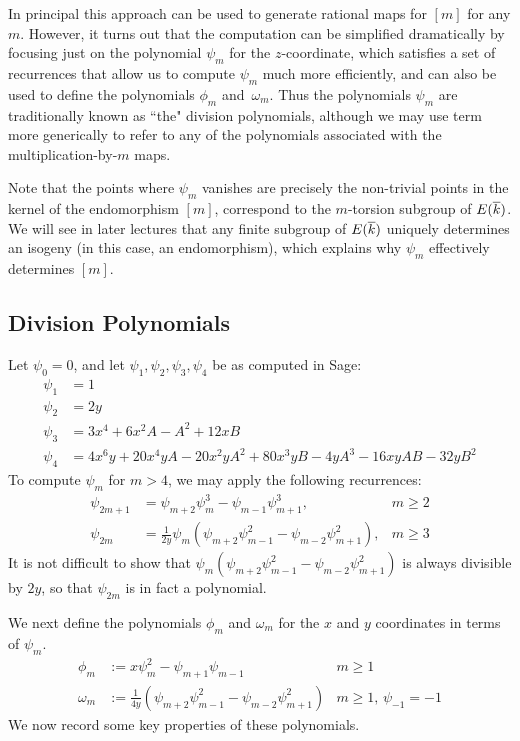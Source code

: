 In principal this approach can be used to generate rational maps for $[m]$ for any $m$.
However, it turns out that the computation can be simplified dramatically by focusing just on the polynomial $\psi_m$ for the $z$-coordinate, which satisfies a set of recurrences that allow us to compute $\psi_m$ much more efficiently, and can also be used to define the polynomials $\phi_m$ and~$\omega_m$.
Thus the polynomials $\psi_m$ are traditionally known as ``the" division polynomials, although we may use term more generically to refer to any of the polynomials associated with the multiplication-by-$m$ maps.

Note that the points where $\psi_m$ vanishes are precisely the non-trivial points in the kernel of the endomorphism $[m]$, correspond to the $m$-torsion subgroup of $E(\overline{k})$.
We will see in later lectures that any finite subgroup of $E(\overline{k})$ uniquely determines an isogeny (in this case, an endomorphism), which explains why $\psi_m$ effectively determines $[m]$.

\subsection{Division Polynomials}

Let $\psi_0=0$, and let $\psi_1,\psi_2,\psi_3,\psi_4$ be as computed in Sage:
\begin{align*}
\psi_1&=1\\
\psi_2&=2y\\
\psi_3&=3x^4+6x^2A-A^2+12xB\\
\psi_4&=4x^6y+20x^4yA-20x^2yA^2+80x^3yB-4yA^3 -16xyAB-32yB^2
\end{align*}
To compute $\psi_m$ for $m>4$, we may apply the following recurrences:
\begin{align*}
\psi_{2m+1} & = \psi_{m+2}\psi_{m}^3-\psi_{m-1}\psi_{m+1}^3, & m \geq 2\\
\psi_{2m} & = \frac{1}{2y}\psi_{m}(\psi_{m+2}\psi_{m-1}^2-\psi_{m-2}\psi_{m+1}^2), & m \geq 3
\end{align*}
It is not difficult to show that $\psi_{m}(\psi_{m+2}\psi_{m-1}^2-\psi_{m-2}\psi_{m+1}^2)$ is always divisible by $2y$, so that $\psi_{2m}$ is in fact a polynomial.

We next define the polynomials $\phi_m$ and $\omega_m$ for the $x$ and $y$ coordinates in terms of $\psi_m$.
\begin{align*}
\phi_{m} & := x\psi_{m}^2-\psi_{m+1}\psi_{m-1} & m \geq 1\\
\omega_{m} & := \frac{1}{4y}(\psi_{m+2}\psi_{m-1}^2-\psi_{m-2}\psi_{m+1}^2) & m \geq 1,\,\psi_{-1} = -1
\end{align*}
We now record some key properties of these polynomials.


